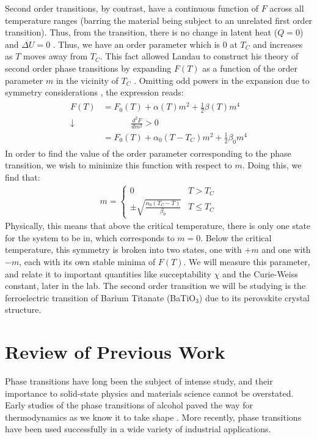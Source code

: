 \documentclass[%
 reprint,
 amsmath,amssymb,
 aps,
 pra,
]{revtex4-1}
\begin{document}
Second order transitions, by contrast, have a continuous function of $F$ across all temperature ranges (barring the material being subject to an unrelated first order transition). Thus, from the transition, there is no change in latent heat ($Q = 0$) and $\Delta U = 0$ \cite{manual}. Thus, we have an order parameter which is $0$ at $T_C$ and increases as $T$ moves away from $T_C$. This fact allowed Landau to construct his theory of second order phase transitions by expanding $F(T)$ as a function of the order parameter $m$ in the vicinity of $T_C$ \cite{manual, phase_1}. Omitting odd powers in the expansion due to symmetry considerations \cite{manual}, the expression reads:
\begin{gather}
	\begin{align}
	F\left(T\right) 	& = F_0\left(T\right)+\alpha(T) m^2+\frac{1}{2}\beta(T) m^4 \nonumber \\
	\downarrow 		& ~~~~~~~~~~~~~~~ \frac{d^2F}{dm^2} > 0 \nonumber \\
					& =F_0\left(T\right)+\alpha_0(T - T_C) m^2+\frac{1}{2}\beta_0 m^4 \nonumber
	\end{align}
\end{gather}
In order to find the value of the order parameter corresponding to the phase transition, we wish to minimize this function with respect to $m$. Doing this, we find that:
\begin{gather}
	m = 	\begin{cases}
			0 & T > T_C \\
			\pm \sqrt{\frac{\alpha_0 (T_C - T)}{\beta_0}} & T \le T_C
		\end{cases} \nonumber
\end{gather}
Physically, this means that above the critical temperature, there is only one state for the system to be in, which corresponds to $m = 0$. Below the critical temperature, this symmetry is broken into two states, one with $+m$ and one with $-m$, each with its own stable minima of $F(T)$. We will measure this parameter, and relate it to important quantities like succeptability $\chi$ and the Curie-Weiss constant, later in the lab. The second order transition we will be studying is the ferroelectric transition of Barium Titanate (BaTiO$_3$) due to its perovskite crystal structure.

\section{Review of Previous Work}

Phase transitions have long been the subject of intense study, and their importance to solid-state physics and materials science cannot be overstated. Early studies of the phase transitions of alcohol paved the way for thermodynamics as we know it to take shape \cite{phase_history}. More recently, phase transitions have been used successfully in a wide variety of industrial applications.
\end{document}
